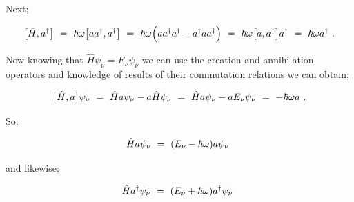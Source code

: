 \documentclass{article}
\begin{document}
Next; 

\begin{equation} \label{eb-eq-256-24}
\big[ \hat{H} , a^{\dagger} \big] \hspace{0.125cm} = \hspace{0.125cm} \hbar \omega \big[ a a^{\dagger} , a^{\dagger} \big] \hspace{0.125cm} = \hspace{0.125cm} \hbar \omega \Big( a a^{\dagger} a^{\dagger} - a^{\dagger} a a^{\dagger} \Big) \hspace{0.125cm} = \hspace{0.125cm} \hbar \omega \big[ a , a^{\dagger} \big] a^{\dagger} \hspace{0.125cm} = \hspace{0.125cm} \hbar \omega a^{\dagger}\hspace{0.125cm} .
\end{equation}

Now knowing that \begin{math} \hat{H} \psi_{\nu} = E_\nu \psi_{\nu} \end{math} we can use the creation and annihilation operators and knowledge of results of their commutation relations we can obtain;

\begin{equation} \label{eb-eq-256-25}
\big[ \hat{H} , a \big] \psi_\nu \hspace{0.125cm} = \hspace{0.125cm} \hat{H} a \psi_\nu - a \hat{H} \psi_\nu \hspace{0.125cm} = \hspace{0.125cm} \hat{H} a \psi_\nu - a E_\nu \psi_\nu \hspace{0.125cm} = \hspace{0.125cm} - \hbar \omega a \hspace{0.125cm} .
\end{equation}

So;

\begin{equation} \label{eb-eq-256-26}
\hat{H} a \psi_\nu  \hspace{0.125cm} = \hspace{0.125cm} ( E_\nu - \hbar \omega ) a \psi_\nu  \hspace{0.125cm}
\end{equation}

and likewise;

\begin{equation} \label{eb-eq-256-27}
\hat{H} a^{\dagger} \psi_\nu  \hspace{0.125cm} = \hspace{0.125cm} ( E_\nu + \hbar \omega ) a^{\dagger} \psi_\nu  \hspace{0.125cm}
\end{equation}
\end{document}
